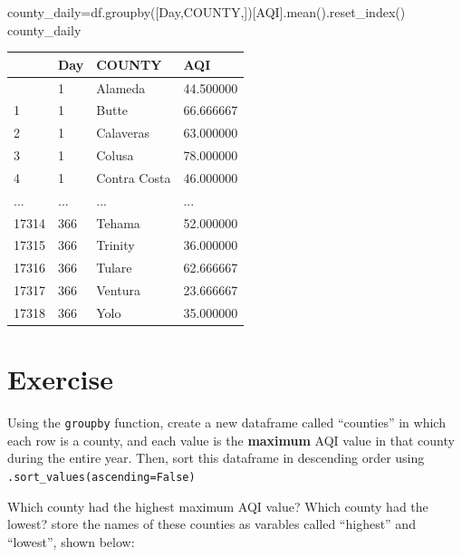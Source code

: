 \documentclass[
  letterpaper,
  DIV=11,
  numbers=noendperiod]{scrreprt}
\newenvironment{Shaded}{\begin{snugshade}}{\end{snugshade}}
\newcommand{\NormalTok}[1]{\textcolor[rgb]{0.00,0.23,0.31}{#1}}
\newcommand{\OperatorTok}[1]{\textcolor[rgb]{0.37,0.37,0.37}{#1}}
\newcommand{\StringTok}[1]{\textcolor[rgb]{0.13,0.47,0.30}{#1}}
\begin{document}
\begin{Shaded}
\begin{Highlighting}[]
\NormalTok{county\_daily}\OperatorTok{=}\NormalTok{df.groupby([}\StringTok{\textquotesingle{}Day\textquotesingle{}}\NormalTok{,}\StringTok{\textquotesingle{}COUNTY\textquotesingle{}}\NormalTok{,])[}\StringTok{\textquotesingle{}AQI\textquotesingle{}}\NormalTok{].mean().reset\_index()}
\NormalTok{county\_daily}
\end{Highlighting}
\end{Shaded}

\begin{longtable}[]{@{}llll@{}}
\toprule\noalign{}
& Day & COUNTY & AQI \\
\midrule\noalign{}
\endhead
\bottomrule\noalign{}
\endlastfoot
0 & 1 & Alameda & 44.500000 \\
1 & 1 & Butte & 66.666667 \\
2 & 1 & Calaveras & 63.000000 \\
3 & 1 & Colusa & 78.000000 \\
4 & 1 & Contra Costa & 46.000000 \\
... & ... & ... & ... \\
17314 & 366 & Tehama & 52.000000 \\
17315 & 366 & Trinity & 36.000000 \\
17316 & 366 & Tulare & 62.666667 \\
17317 & 366 & Ventura & 23.666667 \\
17318 & 366 & Yolo & 35.000000 \\
\end{longtable}

\hypertarget{exercise-6}{%
\section{Exercise}\label{exercise-6}}

Using the \texttt{groupby} function, create a new dataframe called
``counties'' in which each row is a county, and each value is the
\textbf{maximum} AQI value in that county during the entire year. Then,
sort this dataframe in descending order using
\texttt{.sort\_values(ascending=False)}

Which county had the highest maximum AQI value? Which county had the
lowest? store the names of these counties as varables called ``highest''
and ``lowest'', shown below:
\end{document}
